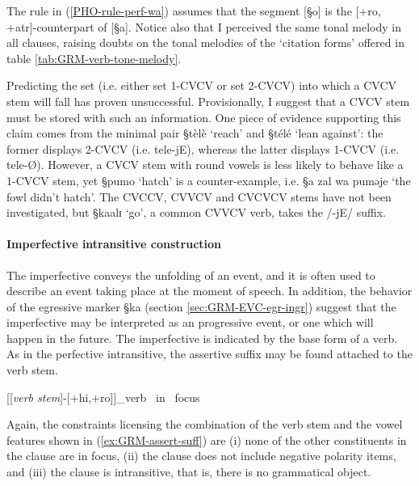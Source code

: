 The rule in (\ref{PHO-rule-perf-wa}) assumes that the segment [{\S o}] is the
[{\sc +ro, +atr}]-counterpart of [{\S a}]. Notice also that I perceived the
same tonal melody in all clauses, raising doubts  on the tonal melodies of the
`citation forms' offered in table \ref{tab:GRM-verb-tone-melody}.

Predicting the set (i.e. either set 1-CVCV or  set 2-CVCV) into which a CVCV
stem
will fall  has proven unsuccessful. Provisionally,  I suggest that a CVCV
stem must be stored with such an information. One piece of evidence
supporting this claim comes from
the minimal pair {\S tèlè} `reach' and  {\S télé} `lean against':  the
former displays 2-CVCV (i.e. tele-jE),  whereas the latter displays 1-CVCV
(i.e. tele-\O).  However,  a CVCV stem with round vowels is less likely to
behave like a 1-CVCV stem, yet {\S pumo} `hatch' is a counter-example, i.e.
{\S a zal wa puməje} `the fowl didn't hatch'. The CVCCV, CVVCV and CVCVCV stems
have  not been investigated, but {\S kaalɪ} `go', a common  CVVCV verb, takes
the
/-jE/ suffix.  


\paragraph{Imperfective intransitive construction}
\label{sec:GRM-verb-perf-intran}

The imperfective  conveys the unfolding of an event, and it is often used to
describe an event taking place at the moment of speech. In addition, the
behavior of the egressive marker {\S ka} (section \ref{sec:GRM-EVC-egr-ingr})
suggest that the imperfective may be interpreted as an progressive event,  or
one which will happen in the future.  The imperfective is indicated by the base
form of a verb. As in the perfective intransitive, the assertive suffix may be
found attached to the verb stem. 


\begin{exe}
\ex\label{ex:GRM-assert-suff}
[[{\it verb stem}]-[{\sc +hi,+ro}]]_{verb \ in \ focus}
\end{exe}

Again, the constraints licensing the combination of the verb stem and the vowel
features  shown in (\ref{ex:GRM-assert-suff})   are (i) none of the other
constituents in the clause are in focus, (ii) the clause does not include
negative polarity items, and (iii) the clause is intransitive, that is, there is
no grammatical object. 




